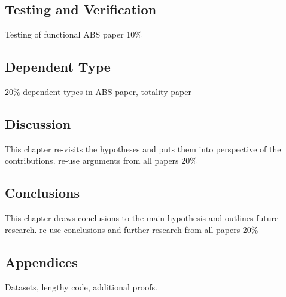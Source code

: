 \subsection{Testing and Verification}
Testing of functional ABS paper
10\%

\subsection{Dependent Type}
20\%
dependent types in ABS paper, totality paper

\subsection{Discussion}
This chapter re-visits the hypotheses and puts them into perspective of the contributions.
re-use arguments from all papers
20\%

\subsection{Conclusions}
This chapter draws conclusions to the main hypothesis and outlines future research.
re-use conclusions and further research from all papers
20\%

\subsection{Appendices}
Datasets, lengthy code, additional proofs.
